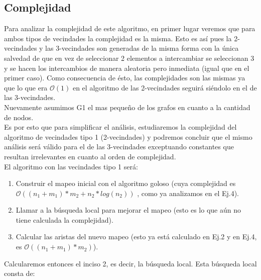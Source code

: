 \subsection{Complejidad}
Para analizar la complejidad de este algoritmo, en primer lugar veremos que para ambos tipos de vecindades la complejidad es la misma. Esto es así pues la 2-vecindades y las 3-vecindades son generadas de la misma forma con la única salvedad de que en vez de seleccionar 2 elementos a intercambiar se seleccionan 3 y se hacen los intercambios de manera aleatoria pero inmediata (igual que en el primer caso). Como consecuencia de ésto, las complejidades son las mismas ya que lo que era $\mathcal{O}(1)$ en el algoritmo de las 2-vecindades seguirá siéndolo en el de las 3-vecindades.\\
Nuevamente asumimos G1 el mas pequeño de los grafos en cuanto a la cantidad de nodos.\\
Es por esto que para simplificar el análisis, estudiaremos la complejidad del algoritmo de vecindades tipo 1 (2-vecindades) y podremos concluir que el mismo análisis será válido para el de las 3-vecindades exceptuando constantes que resultan irrelevantes en cuanto al orden de complejidad.\\
El algoritmo con las vecindades tipo 1 será:
\begin{enumerate}
\item Construir el mapeo inicial con el algoritmo goloso (cuya complejidad es $\mathcal{O}((n_1+m_1)*m_2+n_2*log(n_2))$ , como ya analizamos en el Ej.4).
\item Llamar a la búsqueda local para mejorar el mapeo (esto es lo que aún no tiene calculada la complejidad).
\item Calcular las aristas del nuevo mapeo (esto ya está calculado en Ej.2 y en Ej.4, es $\mathcal{O}((n_1+m_1)*m_2) $).
\end{enumerate}
 Calcularemos entonces el inciso 2, es decir, la búsqueda local.
 Esta búsqueda local consta de:
